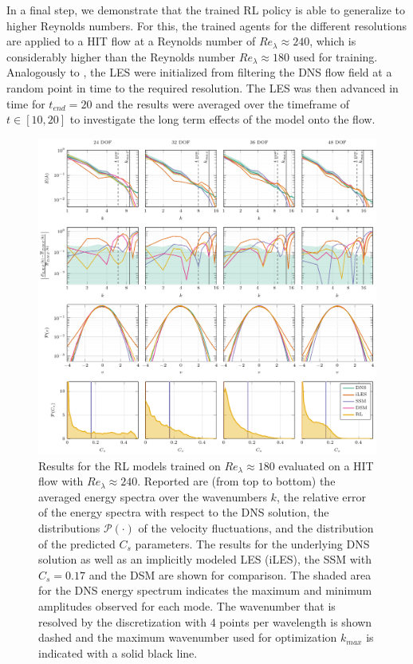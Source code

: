 In a final step, we demonstrate that the trained RL policy is able to generalize to higher Reynolds numbers.
For this, the trained agents for the different resolutions are applied to a HIT flow at a Reynolds number of $Re_{\lambda}\approx 240$, which is considerably higher than the Reynolds number $Re_{\lambda}\approx 180$ used for training.
Analogously to , the LES were initialized from filtering the DNS flow field at a random point in time to the required resolution.
The LES was then advanced in time for $t_{end}=20$ and the results were averaged over the timeframe of $t\in [10,20]$ to investigate the long term effects of the model onto the flow.

\begin{figure}[htb!]
  \centering
  \includegraphics[width=\textwidth]{tikz_double_column/draft-figure6.pdf}
  \caption{Results for the RL models trained on $Re_{\lambda}\approx180$ evaluated on a HIT flow with $Re_{\lambda}\approx240$. Reported are (from top to bottom) the averaged energy spectra over the wavenumbers $k$, the relative error of the energy spectra with respect to the DNS solution, the distributions $\mathcal{P}(\cdot)$ of the velocity fluctuations, and the distribution of the predicted $C_s$ parameters. The results for the underlying DNS solution as well as an implicitly modeled LES (iLES), the SSM with $C_s=0.17$ and the DSM are shown for comparison. The shaded area for the DNS energy spectrum indicates the maximum and minimum amplitudes observed for each mode. The wavenumber that is resolved by the discretization with 4 points per wavelength is shown dashed and the maximum wavenumber used for optimization $k_{max}$ is indicated with a solid black line.}
  \label{fig:generalization_re}
\end{figure}

